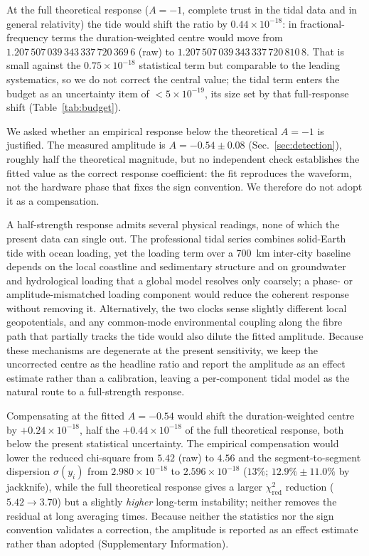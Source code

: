 \documentclass[11pt,a4paper]{article}
\newcommand{\e}[1]{\times 10^{#1}}
\begin{document}
At the full theoretical response ($A=-1$, complete trust in the tidal
data and in general relativity) the tide would shift the ratio by
$0.44\e{-18}$: in fractional-frequency terms the duration-weighted centre
would move from $1.207\,507\,039\,343\,337\,720\,369\,6$ (raw) to
$1.207\,507\,039\,343\,337\,720\,810\,8$. That is small against the
$0.75\e{-18}$ statistical term but comparable to the leading systematics,
so we do not correct the central value; the tidal term enters the budget
as an uncertainty item of $<5\e{-19}$, its size set by that full-response
shift (Table~\ref{tab:budget}).

We asked whether an empirical response below the theoretical $A=-1$ is
justified. The measured amplitude is $A=-0.54\pm0.08$
(Sec.~\ref{sec:detection}), roughly half the theoretical magnitude, but
no independent check establishes the fitted value as the correct response
coefficient: the fit reproduces the waveform, not the hardware phase that
fixes the sign convention. We therefore do not adopt it as a compensation.

A half-strength response admits several physical readings, none of which
the present data can single out. The professional tidal series combines
solid-Earth tide with ocean loading, yet the loading term over a
\qty{700}{km} inter-city baseline depends on the local coastline and
sedimentary structure and on groundwater and hydrological loading that a
global model resolves only coarsely; a phase- or amplitude-mismatched
loading component would reduce the coherent response without removing it.
Alternatively, the two clocks sense slightly different local geopotentials,
and any common-mode environmental coupling along the fibre path that
partially tracks the tide would also dilute the fitted amplitude. Because
these mechanisms are degenerate at the present sensitivity, we keep the
uncorrected centre as the headline ratio and report the amplitude as an
effect estimate rather than a calibration, leaving a per-component tidal
model as the natural route to a full-strength response.

Compensating at the fitted $A=-0.54$ would shift the duration-weighted
centre by $+0.24\e{-18}$, half the $+0.44\e{-18}$ of the full theoretical
response, both below the present statistical uncertainty. The empirical
compensation would lower the reduced chi-square from $5.42$ (raw) to
$4.56$ and the segment-to-segment dispersion $\sigma(y_i)$ from
$2.980\e{-18}$ to $2.596\e{-18}$ ($13\%$; $12.9\%\pm11.0\%$ by jackknife),
while the full theoretical response gives a larger
$\chi^{2}_{\mathrm{red}}$ reduction ($5.42\to3.70$) but a slightly
\emph{higher} long-term instability; neither removes the residual at long
averaging times. Because neither the statistics nor the sign convention
validates a correction, the amplitude is reported as an effect estimate
rather than adopted (Supplementary Information).
\end{document}

